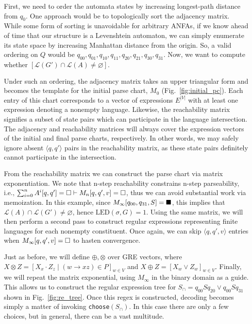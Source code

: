 \documentclass[sigplan,review,acmsmall,nonacm,screen,anonymous]{acmart}\settopmatter{printfolios=false,printccs=false,printacmref=false}
\begin{document}
First, we need to order the automata states by increasing longest-path distance from $q_0$. One approach would be to topologically sort the adjacency matrix. While some form of sorting is unavoidable for arbitrary ANFAs, if we know ahead of time that our structure is a Levenshtein automaton, we can simply enumerate its state space by increasing Manhattan distance from the origin. %
So, a valid ordering on $Q$ would be $q_{00}, q_{01}, q_{10}, q_{11}, q_{20}, q_{21}, q_{30}, q_{31}$. Now, we want to compute whether $[\mathcal{L}(G')\cap \mathcal{L}(A) \neq \varnothing]$.

Under such an ordering, the adjacency matrix takes an upper triangular form and becomes the template for the initial parse chart, $M_0$ (Fig.~\ref{fig:initial_pc}). Each entry of this chart corresponds to a vector of expressions $E^{|V|}$ with at least one expression denoting a nonempty language. Likewise, the reachability matrix signifies a subset of state pairs which can participate in the language intersection. The adjacency and reachability matrices will always cover the expression vectors of the initial and final parse charts, respectively. In other words, we may safely ignore absent $\langle q, q'\rangle$ pairs in the reachability matrix, as these state pairs definitely cannot participate in the intersection.

From the reachability matrix we can construct the parse chart via matrix exponentiation. We note that n-step reachability constrains n-step parseability, i.e., $\sum_{i=0}^n A^i[q, q'] = \square \vdash M_n[q, q', v] = \square$, thus we can avoid substantial work via memoization. In this example, since $M_\infty[q_{00}, q_{31}, S] = \blacksquare$, this implies that $\mathcal{L}(A)\cap \mathcal{L}(G') \neq \varnothing$, hence $\text{LED}(\sigma, G) = 1$. Using the same matrix, we will then perform a second pass to construct regular expressions representing finite languages for each nonempty constituent. Once again, we can skip $\langle q, q', v\rangle$ entries when $M_\infty[q, q', v] = \square$ to hasten convergence.

\enlargethispage{4\baselineskip}
Just as before, we will define $\oplus, \otimes$ over GRE vectors, where $X \otimes Z = [X_x\cdot Z_z \mid (w\rightarrow xz) \in P]_{w\in V}$ and $X \oplus Z= [ X_w\vee Z_w ]_{w\in V}$. Finally, we will repeat the matrix exponential, using $M_\infty$ in the binary domain as a guide. This allows us to construct the regular expression tree for $S_\cap = q_{00}Sq_{20}\vee q_{00}Sq_{31}$ shown in Fig.~\ref{fig:re_tree}. Once this regex is constructed, decoding becomes simply a matter of invoking \texttt{choose}$(S_\cap)$. In this case there are only a few choices, but in general, there can be a vast multitude.
\end{document}
